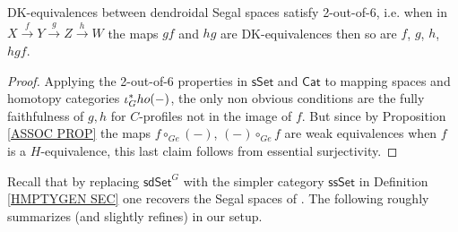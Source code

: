 \documentclass[a4paper,10pt
]{article}%
\begin{document}


\begin{corollary}\label{26COR}
DK-equivalences between dendroidal Segal spaces satisfy 2-out-of-6, i.e. when in
$X \xrightarrow{f} 
Y \xrightarrow{g}
Z \xrightarrow{h} W$ the maps
$gf$ and $hg$ are DK-equivalences then so are
$f$, $g$, $h$, $hgf$.
\end{corollary}

\begin{proof}
Applying the 2-out-of-6 properties in $\mathsf{sSet}$ and $\mathsf{Cat}$ to mapping spaces and homotopy categories $\iota_G^{\**}ho(-)$,
the only non obvious conditions are the fully faithfulness of $g,h$ for $C$-profiles not in the image of $f$. 
But since by Proposition \ref{ASSOC PROP} the maps
$f \circ_{Ge} (-)$, $(-)\circ_{Ge} f$
are weak equivalences when $f$ is a $H$-equivalence,
this last claim follows from essential surjectivity.
\end{proof}

Recall that by replacing $\mathsf{sdSet}^G$
with the simpler category $\mathsf{ssSet}$ in Definition \ref{HMPTYGEN SEC}
one recovers the Segal spaces of \cite{Rez01}.
The following roughly summarizes (and slightly refines)
\cite[Lemma 5.8, Theorem 6.2, Prop. 11.1, Lemma 11.10]{Rez01} in our setup.
\end{document}
